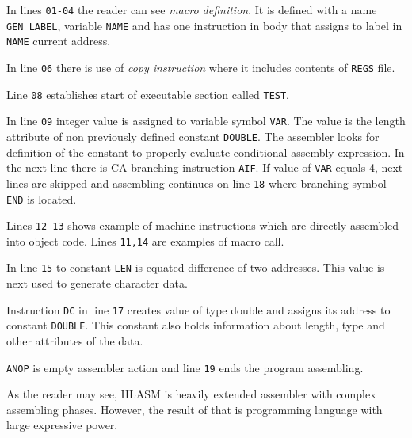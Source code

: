 In lines \verb|01-04| the reader can see \textit{macro definition}. It is defined with a name \verb|GEN_LABEL|, variable \verb|NAME| and has one instruction in body that assigns to label in \verb|NAME| current address.

In line \verb|06| there is use of \textit{copy instruction} where it includes contents of \verb|REGS| file.

Line \verb|08| establishes start of executable section called \verb|TEST|. 

In line \verb|09| integer value is assigned to variable symbol \verb|VAR|. The value is the length attribute of non previously defined constant \verb|DOUBLE|. The assembler looks for definition of the constant to properly evaluate conditional assembly expression. In the next line there is CA branching instruction \verb|AIF|. If value of \verb|VAR| equals 4, next lines are skipped and assembling continues on line \verb|18| where branching symbol \verb|END| is located.  

Lines \verb|12-13| shows example of machine instructions which are directly assembled into object code. Lines \verb|11,14| are examples of macro call.

In line \verb|15| to constant \verb|LEN| is equated difference of two addresses. This value is next used to generate character data.

Instruction \verb|DC| in line \verb|17| creates value of type double and assigns its address to constant \verb|DOUBLE|. This constant also holds information about length, type and other attributes of the data.  

\verb|ANOP| is empty assembler action and line \verb|19| ends the program assembling. 

\vspace{5mm}
As the reader may see, HLASM is heavily extended assembler with complex assembling phases. 
However, the result of that is programming language with large expressive power. 
